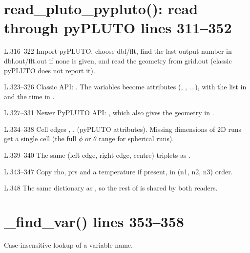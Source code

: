 \section*{\normalsize read\_pluto\_pypluto(): read through pyPLUTO \hfill{\small\mdseries\color{gray}lines 311--352}}

\begin{lines}
\item[L.316–322] Import pyPLUTO, choose dbl/flt, find the last output number in dbl.out/flt.out if none is given, and read the geometry from grid.out (classic pyPLUTO does not report it).
\item[L.323–326] Classic API: . The variables become attributes (, , ...), with the list in  and the time in .
\item[L.327–331] Newer PyPLUTO API: , which also gives the geometry in .
\item[L.334–338] Cell edges , ,  (pyPLUTO attributes). Missing dimensions of 2D runs get a single cell (the full $\phi$ or $\theta$ range for spherical runs).
\item[L.339–340] The same (left edge, right edge, centre) triplets as .
\item[L.343–347] Copy rho, prs and a temperature if present, in (n1, n2, n3) order.
\item[L.348] The same dictionary as , so the rest of  is shared by both readers.
\end{lines}
\section*{\normalsize \_find\_var() \hfill{\small\mdseries\color{gray}lines 353--358}}

Case-insensitive lookup of a variable name.


